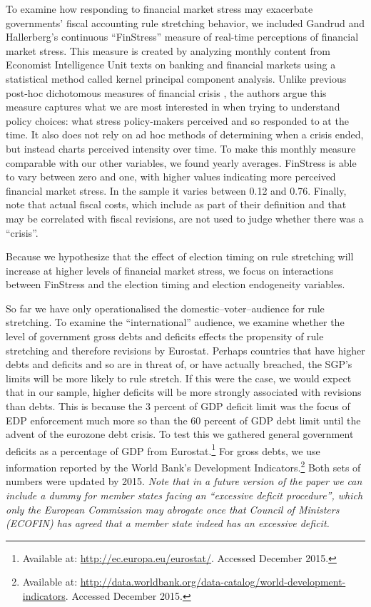 \documentclass[]{article}
\begin{document}
To examine how responding to financial market stress may exacerbate governments' fiscal accounting rule stretching behavior, we included Gandrud and Hallerberg's \citeyearpar{finstress_paper} continuous ``FinStress'' measure of real-time perceptions of financial market stress. This measure is created by analyzing monthly content from Economist Intelligence Unit texts on banking and financial markets using a statistical method called kernel principal component analysis. Unlike previous post-hoc dichotomous measures of financial crisis \citep[e.g. measures compiled by][]{Laeven2012,ReinhartRog2010}, the authors argue this measure captures what we are most interested in when trying to understand policy choices: what stress policy-makers perceived and so responded to at the time. It also does not rely on ad hoc methods of determining when a crisis ended, but instead charts perceived intensity over time. To make this monthly measure comparable with our other variables, we found yearly averages. FinStress is able to vary between zero and one, with higher values indicating more perceived financial market stress. In the sample it varies between 0.12 and 0.76. Finally, note that actual fiscal costs, which \cite{Laeven2012} include as part of their definition and that may be correlated with fiscal revisions, are not used to judge whether there was a ``crisis''.

Because we hypothesize that the effect of election timing on rule stretching will increase at higher levels of financial market stress, we focus on interactions between FinStress and the election timing and election endogeneity variables.

So far we have only operationalised the domestic--voter--audience for rule stretching. To examine the ``international'' audience, we examine whether the level of government gross debts and deficits effects the propensity of rule stretching and therefore revisions by Eurostat. Perhaps countries that have higher debts and deficits and so are in threat of, or have actually breached, the SGP's limits will be more likely to rule stretch. If this were the case, we would expect that in our sample, higher deficits will be more strongly associated with revisions than debts. This is because the 3 percent of GDP deficit limit was the focus of EDP enforcement much more so than the 60 percent of GDP debt limit until the advent of the eurozone debt crisis. To test this we gathered general government deficits as a percentage of GDP from Eurostat.\footnote{Available at: \url{http://ec.europa.eu/eurostat/}. Accessed December 2015.} For gross debts, we use information reported by the World Bank's Development Indicators.\footnote{Available at: \url{http://data.worldbank.org/data-catalog/world-development-indicators}. Accessed December 2015.} Both sets of numbers were updated by 2015. \emph{Note that in a future version of the paper we can include a dummy for member states facing an ``excessive deficit procedure'', which only the European Commission may abrogate once that Council of Ministers (ECOFIN) has agreed that a member state indeed has an excessive deficit.}
\end{document}
